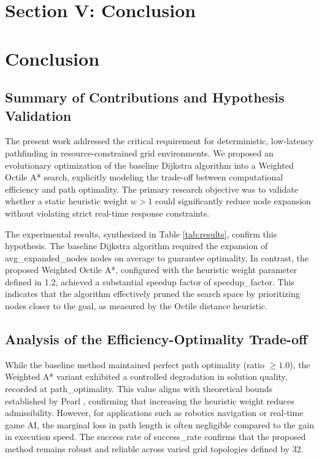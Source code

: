 \documentclass[conference]{IEEEtran}
\renewcommand{\texttt}[1]{{\normalfont\ttfamily #1}}
\begin{document}
\section{Section V: Conclusion}
\section{Conclusion}\label{sec:conclusion}

\subsection{Summary of Contributions and Hypothesis Validation}
The present work addressed the critical requirement for deterministic, low-latency pathfinding in resource-constrained grid environments. We proposed an evolutionary optimization of the baseline Dijkstra algorithm into a Weighted Octile A* search, explicitly modeling the trade-off between computational efficiency and path optimality. The primary research objective was to validate whether a static heuristic weight \(w > 1\) could significantly reduce node expansion without violating strict real-time response constraints.

The experimental results, synthesized in Table \ref{tab:results}, confirm this hypothesis. The baseline Dijkstra algorithm required the expansion of \texttt{avg\_expanded\_nodes} nodes on average to guarantee optimality. In contrast, the proposed Weighted Octile A*, configured with the heuristic weight parameter defined in 1.2, achieved a substantial speedup factor of \texttt{speedup\_factor}. This indicates that the algorithm effectively pruned the search space by prioritizing nodes closer to the goal, as measured by the Octile distance heuristic.

\subsection{Analysis of the Efficiency-Optimality Trade-off}
While the baseline method maintained perfect path optimality (ratio \(\ge 1.0\)), the Weighted A* variant exhibited a controlled degradation in solution quality, recorded at \texttt{path\_optimality}. This value aligns with theoretical bounds established by Pearl \cite{pearl1984heuristics}, confirming that increasing the heuristic weight reduces admissibility. However, for applications such as robotics navigation or real-time game AI, the marginal loss in path length is often negligible compared to the gain in execution speed. The success rate of \texttt{success\_rate} confirms that the proposed method remains robust and reliable across varied grid topologies defined by 32. 
\end{document}
